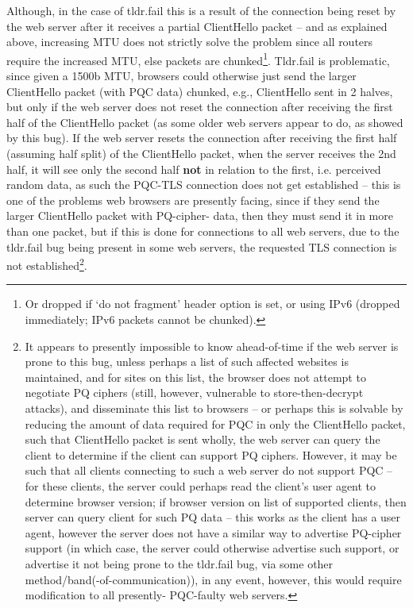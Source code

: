 Although, in the case of tldr.fail this is a result of the connection being reset by the web server after it receives a partial ClientHello packet -- and as explained above, increasing MTU does not strictly solve the problem since all routers require the increased MTU, else packets are chunked\footnote{Or dropped if `do not fragment' header option is set, or using IPv6 (dropped immediately; IPv6 packets cannot be chunked).}. Tldr.fail is problematic, since given a 1500b MTU, browsers could otherwise just send the larger ClientHello packet (with PQC data) chunked, e.g., ClientHello sent in 2 halves, but only if the web server does not reset the connection after receiving the first half of the ClientHello packet (as some older web servers appear to do, as showed by this bug). If the web server resets the connection after receiving the first half (assuming half split) of the ClientHello packet, when the server receives the 2nd half, it will see only the second half \textbf{not} in relation to the first, i.e. perceived random data, as such the PQC-TLS connection does not get established -- this is one of the problems web browsers are presently facing, since if they send the larger ClientHello packet with PQ-cipher- data, then they must send it in more than one packet, but if this is done for connections to all web servers, due to the tldr.fail bug being present in some web servers, the requested TLS connection is not established\footnote{It appears to presently impossible to know ahead-of-time if the web server is prone to this bug, unless perhaps a list of such affected websites is maintained, and for sites on this list, the browser does not attempt to negotiate PQ ciphers (still, however, vulnerable to store-then-decrypt attacks), and disseminate this list to browsers -- or perhaps this is solvable by reducing the amount of data required for PQC in only the ClientHello packet, such that ClientHello packet is sent wholly, the web server can query the client to determine if the client can support PQ ciphers. However, it may be such that all clients connecting to such a web server do not support PQC -- for these clients, the server could perhaps read the client's user agent to determine browser version; if browser version on list of supported clients, then server can query client for such PQ data -- this works as the client has a user agent, however the server does not have a similar way to advertise PQ-cipher support (in which case, the server could otherwise advertise such support, or advertise it not being prone to the tldr.fail bug, via some other method/band(-of-communication)), in any event, however, this would require modification to all presently- PQC-faulty web servers.}.
